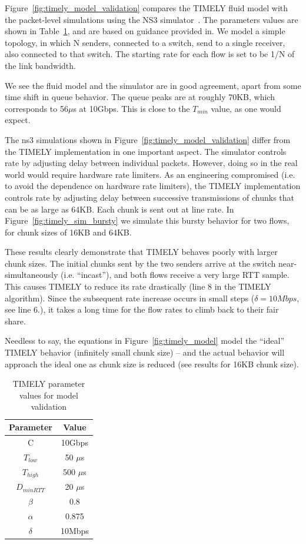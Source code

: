 
Figure~\ref{fig:timely_model_validation} compares the TIMELY fluid model with
the packet-level simulations using the NS3 simulator~\cite{ns3}. The parameters
values are shown in Table~\ref{tab:timely_model_validation}, and are based on
guidance provided in\cite{timely}.  We model a simple topology, in which N
senders, connected to a switch, send to a single receiver, also connected to
that switch. The starting rate for each flow is set to be 1/N of the link
bandwidth. 

We see the fluid model and the simulator are in good agreement, apart from some
time shift in queue behavior. The queue peaks are at roughly 70KB, which
corresponds to 56$\mu$s at 10Gbps. This is close to the $T_{min}$ value, as one
would expect.

The ns3 simulations shown in Figure~\ref{fig:timely_model_validation} differ
from the TIMELY implementation in one important aspect. The simulator controls
rate by adjusting delay between individual packets. However, doing so in the
real world would require hardware rate limiters. As an engineering compromised
(i.e. to avoid the dependence on hardware rate limiters), the TIMELY
implementation controls rate by adjusting delay between successive transmissions
of chunks that can be as large as 64KB. Each chunk is sent out at line rate.  In
Figure~\ref{fig:timely_sim_bursty} we simulate this bursty behavior for two
flows, for chunk sizes of 16KB and 64KB.

These results clearly demonstrate that TIMELY behaves poorly with larger chunk
sizes. The initial chunks sent by the two senders arrive at the switch
near-simultaneously (i.e. ``incast''), and both flows receive a very large RTT
sample. This causes TIMELY to reduce its rate drastically (line 8 in the TIMELY
algorithm). Since the subsequent rate increase occurs in small steps ($\delta =
10Mbps$, see line 6.), it takes a long time for the flow rates to climb back to
their fair share.

Needless to say, the equations in Figure~\ref{fig:timely_model} model the
``ideal'' TIMELY behavior (infinitely small chunk size) -- and the actual
behavior will approach the ideal one as chunk size is reduced (see results for
16KB chunk size).

\begin{table}[t]
\small
\center
\begin{tabular}{c|c}
Parameter & Value \\ \hline
C & 10Gbps \\ 
$T_{low}$ & 50 $\mu$s \\ 
$T_{high}$ & 500 $\mu$s \\
$D_{minRTT}$ & 20 $\mu$s \\
$\beta$ & 0.8 \\
$\alpha$ & 0.875 \\
$\delta$ & 10Mbps
\end{tabular}
\caption{TIMELY parameter values for model validation}
\label{tab:timely_model_validation}
\end{table}

